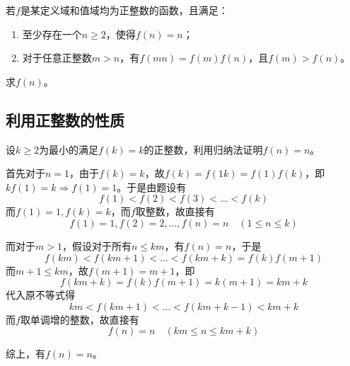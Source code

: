 

若$f$是某定义域和值域均为正整数的函数，且满足：
\begin{enumerate}
  \item 至少存在一个$n \ge 2$，使得$f(n) = n$；
  \item 对于任意正整数$m > n$，有$f(mn) = f(m)f(n)$，且$f(m) > f(n)$。
\end{enumerate}
求$f(n)$。


\subsection{利用正整数的性质}

设$k \ge 2$为最小的满足$f(k) = k$的正整数，利用归纳法证明$f(n) = n$。

首先对于$n = 1$，由于$f(k) = k$，故$f(k) = f(1k) = f(1)f(k)$，即$kf(1) = k \Rightarrow f(1) = 1$。于是由题设有
\[ f(1) < f(2) < f(3) < \dots < f(k) \]
而$f(1) = 1, f(k) = k$，而$f$取整数，故直接有
\[ f(1) = 1, f(2) = 2, \dots, f(n) = n\quad(1 \le n \le k) \]

而对于$m > 1$，假设对于所有$n \le km$，有$f(n) = n$，于是
\[ f(km) < f(km + 1) < \dots < f(km + k) = f(k)f(m + 1) \]
而$m + 1 \le km$，故$f(m + 1) = m + 1$，即
\[ f(km + k) = f(k)f(m + 1) = k(m + 1) = km + k \]
代入原不等式得
\[ km < f(km + 1) < \dots < f(km + k - 1) < km + k \]
而$f$取单调增的整数，故直接有
\[ f(n) = n\quad(km \le n \le km + k) \]

综上，有$f(n) = n$。
